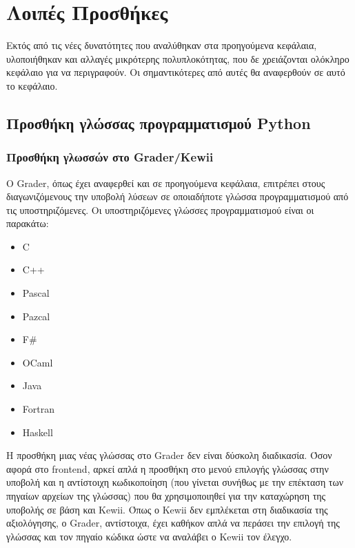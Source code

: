\documentclass[diploma]{softlab-thesis}
\begin{document}
\chapter{Λοιπές Προσθήκες}

Εκτός από τις νέες δυνατότητες που αναλύθηκαν στα προηγούμενα κεφάλαια,
υλοποιήθηκαν και αλλαγές μικρότερης πολυπλοκότητας, που δε χρειάζονται
ολόκληρο κεφάλαιο για να περιγραφούν. Οι σημαντικότερες από αυτές
θα αναφερθούν σε αυτό το κεφάλαιο.

\section{Προσθήκη γλώσσας προγραμματισμού Python}

\subsection{Προσθήκη γλωσσών στο Grader/Kewii}


Ο Grader, όπως έχει αναφερθεί και σε προηγούμενα κεφάλαια, επιτρέπει
στους διαγωνιζόμενους την υποβολή λύσεων σε οποιαδήποτε γλώσσα
προγραμματισμού από τις υποστηριζόμενες. Οι υποστηριζόμενες γλώσσες
προγραμματισμού είναι οι παρακάτω:

\begin{itemize}
    \setlength\itemsep{0em}
    \item C
    \item C++
    \item Pascal
    \item Pazcal
    \item F\#
    \item OCaml
    \item Java
    \item Fortran
    \item Haskell
\end{itemize}

\bigskip

Η προσθήκη μιας νέας γλώσσας στο Grader δεν είναι δύσκολη διαδικασία.
Όσον αφορά στο frontend, αρκεί απλά η προσθήκη στο μενού επιλογής γλώσσας
στην υποβολή και η αντίστοιχη κωδικοποίηση (που γίνεται συνήθως με την επέκταση
των πηγαίων αρχείων της γλώσσας) που θα χρησιμοποιηθεί για την καταχώρηση της
υποβολής σε βάση και Kewii. Όπως ο Kewii δεν εμπλέκεται στη διαδικασία της
αξιολόγησης, ο Grader, αντίστοιχα, έχει καθήκον απλά να περάσει την επιλογή
της γλώσσας και τον πηγαίο κώδικα ώστε να αναλάβει ο Kewii τον έλεγχο.
\end{document}
